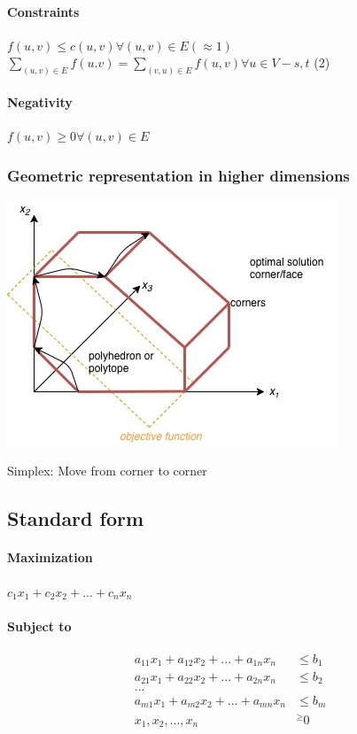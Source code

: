 \paragraph{Constraints} $f(u,v) \leq c(u,v) \forall (u,v) \in E (\approx 1)$ \\
$\sum_{(u,v) \in E}f(u.v) = \sum_{(v,u) \in E}f(u,v) \forall u \in V-{s,t}$ (2)
\paragraph{Negativity} $f(u,v) \geq 0 \forall (u,v) \in E$ 

\subsubsection{Geometric representation in higher dimensions}
\begin{center}
	\includegraphics[scale=0.5]{img/dia2}
\end{center}
Simplex: Move from corner to corner
\subsection{Standard form}
\paragraph{Maximization} $c_1x_1 + c_2x_2 + ... + c_nx_n$
\paragraph{Subject to} \begin{align*}
	a_{11}x_1 + a_{12}x_2  + ... + a_{1n}x_n  &\leq b_1 \\
	a_{21}x_1 + a_{22}x_2  + ... + a_{2n}x_n  &\leq b_2 \\
	... \\
	a_{m1}x_1 + a_{m2}x_2  + ... + a_{mn}x_n  &\leq b_m \\
	x_1,x_2,...,x_n  &^\geq 0 \\
\end{align*}

